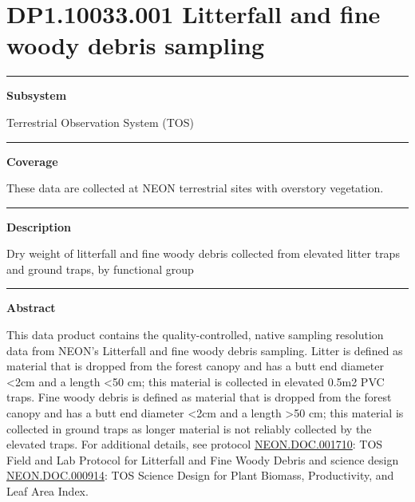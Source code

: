 \documentclass[]{article}
\begin{document}
\section{DP1.10033.001 Litterfall and fine woody debris
sampling}\label{dp1.10033.001-litterfall-and-fine-woody-debris-sampling}

\begin{center}\rule{0.5\linewidth}{\linethickness}\end{center}

\textbf{Subsystem}

Terrestrial Observation System (TOS)

\begin{center}\rule{0.5\linewidth}{\linethickness}\end{center}

\textbf{Coverage}

These data are collected at NEON terrestrial sites with overstory
vegetation.

\begin{center}\rule{0.5\linewidth}{\linethickness}\end{center}

\textbf{Description}

Dry weight of litterfall and fine woody debris collected from elevated
litter traps and ground traps, by functional group

\begin{center}\rule{0.5\linewidth}{\linethickness}\end{center}

\textbf{Abstract}

This data product contains the quality-controlled, native sampling
resolution data from NEON's Litterfall and fine woody debris sampling.
Litter is defined as material that is dropped from the forest canopy and
has a butt end diameter \textless{}2cm and a length \textless{}50 cm;
this material is collected in elevated 0.5m2 PVC traps. Fine woody
debris is defined as material that is dropped from the forest canopy and
has a butt end diameter \textless{}2cm and a length \textgreater{}50 cm;
this material is collected in ground traps as longer material is not
reliably collected by the elevated traps. For additional details, see
protocol
\href{http://data.neonscience.org/api/v0/documents/NEON.DOC.001710vE}{NEON.DOC.001710}:
TOS Field and Lab Protocol for Litterfall and Fine Woody Debris and
science design
\href{http://data.neonscience.org/api/v0/documents/NEON.DOC.000914vA}{NEON.DOC.000914}:
TOS Science Design for Plant Biomass, Productivity, and Leaf Area Index.
\end{document}
